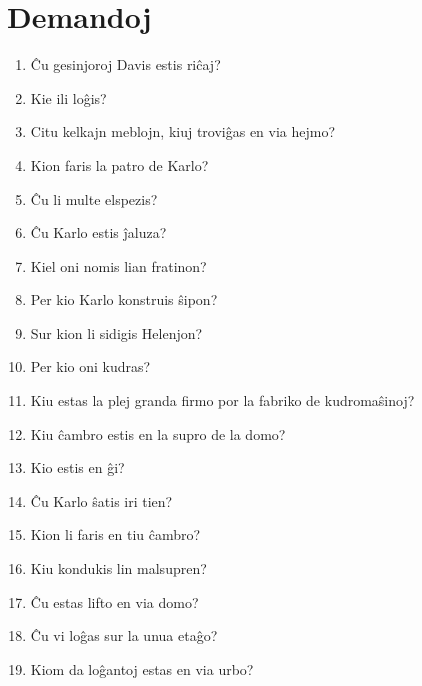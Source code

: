 \newpage

\section*{Demandoj}

\begin{enumerate}
    \item  Ĉu gesinjoroj Davis estis riĉaj?
    \item  Kie ili loĝis?
    \item  Citu kelkajn meblojn, kiuj troviĝas en via hejmo?
    \item  Kion faris la patro de Karlo?
    \item  Ĉu li multe elspezis?
    \item  Ĉu Karlo estis ĵaluza?
    \item  Kiel oni nomis lian fratinon?
    \item  Per kio Karlo konstruis ŝipon?
    \item  Sur kion li sidigis Helenjon?
    \item  Per kio oni kudras?
    \item  Kiu estas la plej granda firmo por la fabriko de kudromaŝinoj?
    \item  Kiu ĉambro estis en la supro de la domo?
    \item  Kio estis en ĝi?
    \item  Ĉu Karlo ŝatis iri tien?
    \item  Kion li faris en tiu ĉambro?
    \item  Kiu kondukis lin malsupren?
    \item  Ĉu estas lifto en via domo?
    \item  Ĉu vi loĝas sur la unua etaĝo?
    \item  Kiom da loĝantoj estas en via urbo?
\end{enumerate}
